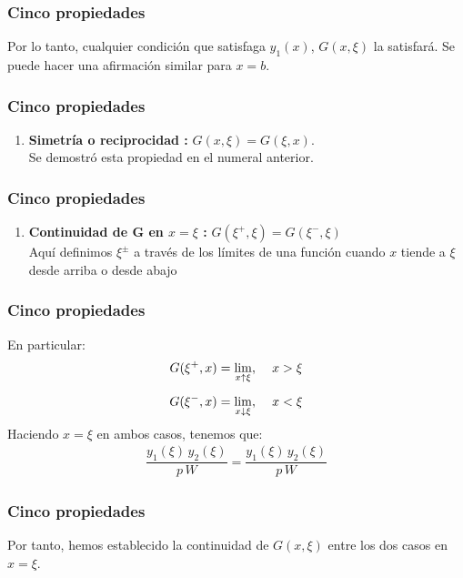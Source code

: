 \documentclass[12pt]{beamer}
\begin{document}
\begin{frame}
\frametitle{Cinco propiedades}
Por lo tanto, cualquier condición que satisfaga $y_{1} (x)$, $G (x, \xi)$ la satisfará. Se puede hacer una afirmación similar para $x = b$.
\end{frame}
\begin{frame}
\frametitle{Cinco propiedades}
\begin{enumerate}[<+->]
\conti
\item \textbf{Simetría o reciprocidad :} $G (x, \xi) = G (\xi, x)$. 
\\
\bigskip
\pause
Se demostró esta propiedad en el numeral anterior.
\seti
\end{enumerate}
\end{frame}
\begin{frame}
\frametitle{Cinco propiedades}
\begin{enumerate}[<+->]
\conti
\item \textbf{Continuidad de $\mathbf{G}$ en $x = \xi$ :} $G (\xi^{+}, \xi) = G (\xi^{-}, \xi)$
\\
\bigskip
\pause
Aquí definimos $\xi^{\pm}$ a través de los límites de una función cuando $x$ tiende a $\xi$ desde arriba o desde abajo
\seti
\end{enumerate}
\end{frame}
\begin{frame}
\frametitle{Cinco propiedades}
En particular:
\pause
\begin{align*}
G (\xi^{+}, x) &= \lim_{x \uparrow \xi}, \hspace{0.4cm} x > \xi \\[0.5em]
G (\xi^{-}, x) &= \lim_{x \downarrow \xi}, \hspace{0.4cm} x < \xi
\end{align*}
\pause
Haciendo $x = \xi$ en ambos casos, tenemos que:
\pause
\begin{align*}
\dfrac{y_{1} (\xi) \, y_{2} (\xi)}{p \, W} = \dfrac{y_{1} (\xi) \, y_{2} (\xi)}{p \, W}
\end{align*}
\end{frame}
\begin{frame}
\frametitle{Cinco propiedades}
Por tanto, hemos establecido la continuidad de $G (x, \xi)$ entre los dos casos en $x = \xi$.
\end{frame}
\end{document}
